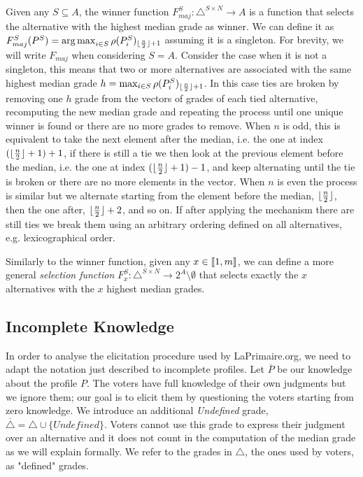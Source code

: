 \documentclass[version=3.21, pagesize, twoside=off, bibliography=totoc, DIV=calc, fontsize=12pt, a4paper]{scrartcl}
\begin{document}
Given any $S\subseteq A$, the winner function $F^S_{maj}:\triangle^{S \times N} \rightarrow A$ %
is a function that selects the alternative with the highest median grade as winner. We can define it as $F^S_{maj}(P^S) = \operatorname*{arg\,max}_{i\in S}\rho(P^S_i)_{\lfloor\frac{n}{2}\rfloor+ 1}$ assuming it is a singleton. For brevity, we will write $F_{maj}$ when considering $S=A$. Consider the case when it is not a singleton, this means that two or more alternatives are associated with the same highest median grade $h=\max_{i\in S}\rho(P^S_i)_{\lfloor\frac{n}{2}\rfloor + 1}$. In this case ties are broken by removing one $h$ grade from the vectors of grades of each tied alternative, recomputing the new median grade and repeating the process until one unique winner is found or there are no more grades to remove. When $n$ is odd, this is equivalent to take the next element after the median, i.e. the one at index $(\lfloor\frac{n}{2}\rfloor + 1) +1$, if there is still a tie we then look at the previous element before the median, i.e. the one at index $(\lfloor\frac{n}{2}\rfloor + 1) -1$, and keep alternating until the tie is broken or there are no more elements in the vector. When $n$ is even the process is similar but we alternate starting from the element before the median, $\lfloor\frac{n}{2}\rfloor$, then the one after, $\lfloor\frac{n}{2}\rfloor + 2$, and so on.  If after applying the mechanism there are still ties we break them using an arbitrary ordering defined on all alternatives, e.g. lexicographical order.

Similarly to the winner function, given any $x \in \llbracket1,m\rrbracket$, we can define a more general \emph{selection function} $F^S_x:\triangle^{S\times N} \rightarrow 2^A \setminus \emptyset$ that selects exactly the $x$ alternatives with the $x$ highest median grades.

\subsection{Incomplete Knowledge}
In order to analyse the elicitation procedure used by LaPrimaire.org, we need to adapt the notation just described to incomplete profiles. 
 Let $\overline{P}$ be our knowledge about the profile $P$.
The voters have full knowledge of their own judgments but we ignore them; our goal is to elicit them by questioning the voters starting from zero knowledge.
We introduce an additional \emph{Undefined} grade, $\overline{\triangle}=\triangle \cup \{\textit{Undefined}\}$. Voters cannot use this grade to express their judgment over an alternative and it does not count in the computation of the median grade as we will explain formally. We refer to the grades in $\triangle$, the ones used by voters, as "defined" grades.
\end{document}
